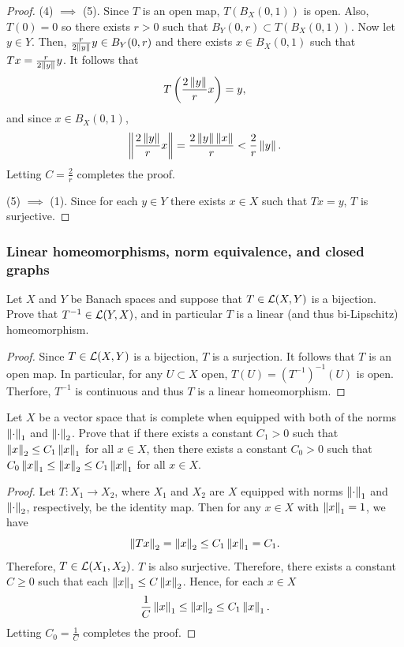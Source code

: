 \documentclass[a4paper]{article}
\begin{document}
\begin{proof}
  (4) $\implies$ (5). Since $T$ is an open map, $T(B_X(0, 1))$ is
  open. Also, $T(0) = 0$ so there exists $r > 0$ such that
  $B_Y(0, r) \subset T(B_X(0, 1))$. Now let $y \in Y$. Then,
  $\frac{r}{2 \left\lVert y\right\rVert} y \in B_Y(0, r)$ and there exists
  $x \in B_X(0, 1)$ such that $Tx = \frac{r}{2 \left\lVert y\right\rVert} y$.
  It follows that
  \[
    T \left( \frac{2\left\lVert y\right\rVert}{r} x \right) = y,
  \]
  and since $x \in B_X(0, 1)$,
  \[
    \left\lVert \frac{2 \left\lVert y\right\rVert}{r} x\right\rVert = \frac{2 \left\lVert y\right\rVert \left\lVert x\right\rVert}{r}
    < \frac{2}{r} \left\lVert y\right\rVert.
  \]
  Letting $C = \frac{2}{r}$ completes the proof.

  (5) $\implies$ (1). Since for each $y \in Y$ there exists
  $x \in X$ such that $T x = y$, $T$ is surjective.

\end{proof}

\subsubsection*{Linear homeomorphisms, norm equivalence,
  and closed graphs}
\begin{thm}
  Let $X$ and $Y$ be Banach spaces and suppose that $T \in \mathcal{L}(X,Y)$ is a
  bijection. Prove that $T^{-1} \in \mathcal{L}(Y,X)$, and in particular $T$ is a
  linear (and thus bi-Lipschitz) homeomorphism.
\end{thm}

\begin{proof}
  Since $T \in \mathcal{L}(X, Y)$ is a bijection, $T$ is a surjection. It follows
  that $T$ is an open map. In particular, for any $U \subset X$ open,
  $T(U) = (T^{-1})^{-1}(U)$ is open. Therfore, $T^{-1}$ is continuous and
  thus $T$ is a linear homeomorphism.

\end{proof}

\begin{thm}
  Let $X$ be a vector space that is complete when equipped with both of
  the norms $\left\lVert \cdot\right\rVert_1$ and $\left\lVert \cdot\right\rVert_2$. Prove that if there
  exists a constant $C_1>0$ such that $\left\lVert x\right\rVert_2 \leq C_1 \left\lVert x\right\rVert_1$ for
  all $x \in X$, then there exists a constant $C_0 >0$ such that $C_0
    \left\lVert x\right\rVert_1 \leq \left\lVert x\right\rVert_2 \leq C_1 \left\lVert x\right\rVert_1$ for all $x \in X$.
\end{thm}

\begin{proof}
  Let $T: X_1 \to X_2$, where $X_1$ and $X_2$ are $X$ equipped with norms
  $\left\lVert \cdot\right\rVert_1$ and $\left\lVert \cdot\right\rVert_2$, respectively, be the identity
  map. Then for any $x \in X$ with $\left\lVert x\right\rVert_1 = 1$, we have
  \[
    \left\lVert T x\right\rVert_2 = \left\lVert x\right\rVert_2 \leq C_1 \left\lVert x\right\rVert_1 = C_1.
  \]
  Therefore, $T \in \mathcal{L}(X_1, X_2)$. $T$ is also surjective. Therefore,
  there exists a constant $C \geq 0$ such that each $\left\lVert x\right\rVert_1 \leq C
  \left\lVert x\right\rVert_2$. Hence, for each $x \in X$
  \[
    \frac{1}{C} \left\lVert x\right\rVert_1 \leq \left\lVert x\right\rVert_2 \leq C_1 \left\lVert x\right\rVert_1.
  \]
  Letting $C_0 = \frac{1}{C}$ completes the proof.

\end{proof}
\end{document}
